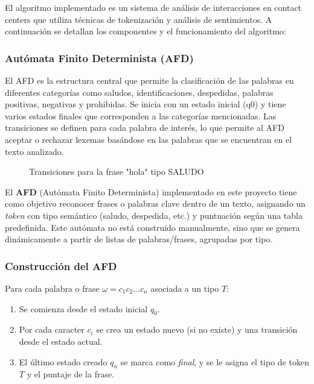 El algoritmo implementado es un sistema de análisis de interacciones en contact centers que
utiliza técnicas de tokenización y análisis de sentimientos. A continuación se detallan los
componentes y el funcionamiento del algoritmo:

\subsubsection{Autómata Finito Determinista (AFD)}
El AFD es la estructura central que permite la clasificación de las palabras en diferentes
categorías como saludos, identificaciones, despedidas, palabras positivas, negativas y
prohibidas. Se inicia con un estado inicial (q0) y tiene varios estados finales que
corresponden a las categorías mencionadas. Las transiciones se definen para cada palabra de
interés, lo que permite al AFD aceptar o rechazar lexemas basándose en las palabras que se
encuentran en el texto analizado.

\begin{figure}[h]
	\centering
	\caption{Transiciones para la frase "hola" tipo SALUDO}
\end{figure}


El \textbf{AFD} (Autómata Finito Determinista) implementado en este proyecto tiene como
objetivo reconocer frases o palabras clave dentro de un texto, asignando un \textit{token} con
tipo semántico (saludo, despedida, etc.) y puntuación según una tabla predefinida. Este
autómata no está construido manualmente, sino que se genera dinámicamente a partir de listas de
palabras/frases, agrupadas por tipo.

\subsubsection{Construcción del AFD}

Para cada palabra o frase $\omega = c_1 c_2 \ldots c_n$ asociada a un tipo $T$:
\begin{enumerate}
	\item Se comienza desde el estado inicial $q_0$.
	\item Por cada caracter $c_i$ se crea un estado nuevo (si no existe) y una transición desde el estado actual.
	\item El último estado creado $q_n$ se marca como \textit{final}, y se le asigna el tipo de token $T$ y el puntaje de la frase.
\end{enumerate}

